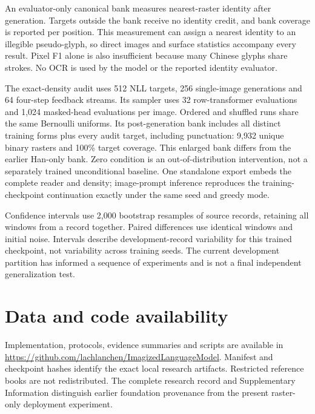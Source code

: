 An evaluator-only canonical bank measures nearest-raster identity after
generation. Targets outside the bank receive no identity credit, and bank
coverage is reported per position. This measurement can assign a nearest
identity to an illegible pseudo-glyph, so direct images and surface statistics
accompany every result. Pixel F1 alone is also insufficient because many
Chinese glyphs share strokes. No OCR is used by the model or the reported
identity evaluator.

The exact-density audit uses 512 NLL targets, 256 single-image generations and
64 four-step feedback streams. Its sampler uses 32 row-transformer evaluations
and 1,024 masked-head evaluations per image. Ordered and shuffled runs share
the same Bernoulli uniforms. Its post-generation bank includes all distinct
training forms plus every audit target, including punctuation: 9,932 unique
binary rasters and 100\% target coverage. This enlarged bank differs from the
earlier Han-only bank. Zero condition is an out-of-distribution intervention,
not a separately trained unconditional baseline. One standalone export embeds
the complete reader and density; image-prompt inference reproduces the
training-checkpoint continuation exactly under the same seed and greedy mode.

Confidence intervals use 2,000 bootstrap resamples of source records, retaining
all windows from a record together. Paired differences use identical windows
and initial noise. Intervals describe development-record variability for this
trained checkpoint, not variability across training seeds. The current
development partition has informed a sequence of experiments and is not a
final independent generalization test.

\balance
\section*{Data and code availability}
Implementation, protocols, evidence summaries and scripts are available in
\url{https://github.com/lachlanchen/ImagizedLanguageModel}. Manifest and
checkpoint hashes identify the exact local research artifacts. Restricted
reference books are not redistributed. The complete research record and
Supplementary Information distinguish earlier foundation provenance from the
present raster-only deployment experiment.


